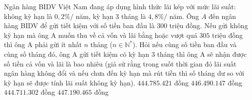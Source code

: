 \begin{ex}%
Ngân hàng BIDV Việt Nam đang áp dụng hình thức lãi kép với mức lãi suất: không kỳ hạn là $0{,}2\%/$ năm, kỳ hạn $3$ tháng là $4{,}8\%/$ năm. Ông $A$ đến ngân hàng BIDV để gửi tiết kiệm với số tiền ban đầu là $300$ triệu đồng. Nếu gửi không kỳ hạn mà ông A muốn thu về cả vốn và lãi bằng hoặc vượt quá $305$ triệu đồng thì ông A phải gửi ít nhất $n$ tháng ($n\in \mathbb{N^{*}}$). Hỏi nếu cùng số tiền ban đầu và cùng số tháng đó, ông A gửi tiết kiệm có kỳ hạn $3$ tháng thì ông A sẽ nhận được số tiền cả vốn và lãi là bao nhiêu (giả sử rằng trong suốt thời gian đó lãi suất ngân hàng không đổi và nếu chưa đến kỳ hạn mà rút tiền thì số tháng dư so với kỳ hạn sẽ được tính lãi suất không kỳ hạn).
\choice
{\True $444.785.421$ đồng}
{$446.490.147$ đồng}
{$444.711.302$ đồng}
{$447.190.465$ đồng}
\end{ex}
